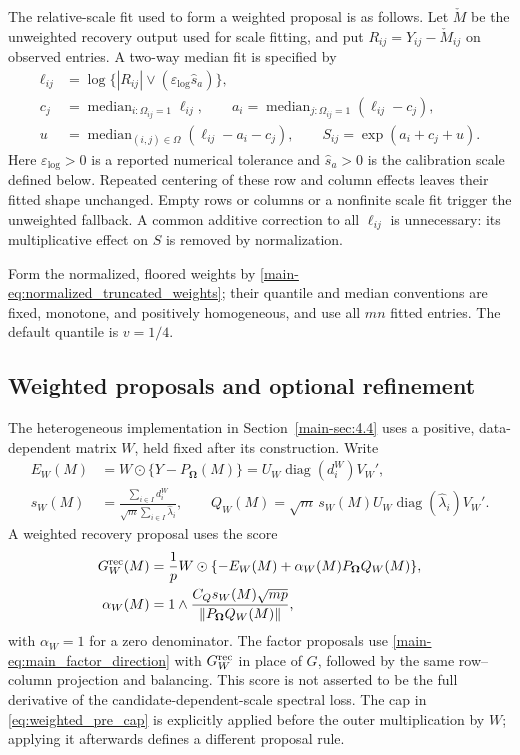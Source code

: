 \documentclass[numsec,webpdf,modern,large,namedate]{oup-authoring-template}
\theoremstyle{plain}
\theoremstyle{remark}
\newcommand{\bOmega}{\bm{\Omega}}
\newif\ifmarkchanges
\newenvironment{revision}{\begingroup\ifmarkchanges\color{red}\fi}{\endgroup}
\begin{document}
\begin{revision}
The relative-scale fit used to form a weighted proposal is as follows.
Let $\check M$ be the unweighted recovery output used for scale fitting,
and put $R_{ij}=Y_{ij}-\check M_{ij}$ on observed entries.  A two-way median
fit is specified by
\begin{align}
 \ell_{ij}&=\log\{|R_{ij}|\vee(\varepsilon_{\log}\widehat s_a)\},\nonumber\\
 c_j&=\operatorname{median}_{i:\Omega_{ij}=1}\ell_{ij},\qquad
 a_i=\operatorname{median}_{j:\Omega_{ij}=1}(\ell_{ij}-c_j),\nonumber\\
 u&=\operatorname{median}_{(i,j)\in\Omega}
                         (\ell_{ij}-a_i-c_j),\qquad
 S_{ij}=\exp(a_i+c_j+u).
 \label{eq:weighted_median_profile}
\end{align}
Here $\varepsilon_{\log}>0$ is a reported numerical tolerance and
$\widehat s_a>0$ is the calibration scale defined below.  Repeated
centering of these row and column effects leaves their fitted shape
unchanged. Empty rows or columns or a nonfinite scale fit trigger the
unweighted fallback. A common additive correction to all $\ell_{ij}$ is
unnecessary: its multiplicative effect on $S$ is removed by normalization.


Form the normalized, floored weights by
\eqref{main-eq:normalized_truncated_weights}; their quantile and median
conventions are fixed, monotone, and positively homogeneous, and use all
$mn$ fitted entries. The default quantile is $v=1/4$.

\subsection{Weighted proposals and optional refinement}
The heterogeneous implementation in Section~\ref{main-sec:4.4} uses a positive,
data-dependent matrix $W$, held fixed after its construction.  Write
\begin{align*}
 E_W(M)&=W\odot\{Y-P_{\bOmega}(M)\}
             =U_W\operatorname{diag}(d_i^W)V_W',\\
 s_W(M)&=\frac{\sum_{i\in I}d_i^W}
                   {\sqrt m\sum_{i\in I}\widehat\lambda_i},\qquad
 Q_W(M)=\sqrt m\,s_W(M)U_W
                \operatorname{diag}(\widehat\lambda_i)V_W'.
\end{align*}
A weighted recovery proposal uses the score
\begin{align}
 G_W^{\rm rec}(M)
 &=\frac1p W\odot\{-E_W(M)+\alpha_W(M)P_{\bOmega}Q_W(M)\},
 \label{eq:weighted_recovery_score}\\
 \alpha_W(M)
 &=1\wedge\frac{C_Qs_W(M)\sqrt{mp}}
                         {\|P_{\bOmega}Q_W(M)\|},
 \label{eq:weighted_pre_cap}
\end{align}
with $\alpha_W=1$ for a zero denominator.  The factor proposals use
\eqref{main-eq:main_factor_direction} with $G_W^{\rm rec}$ in place of $G$,
followed by the same row--column projection and balancing.  This score is
not asserted to be the full derivative of the candidate-dependent-scale
spectral loss. The cap in \eqref{eq:weighted_pre_cap} is explicitly applied
before the outer multiplication by $W$; applying it afterwards defines a
different proposal rule.


\end{revision}
\end{document}
